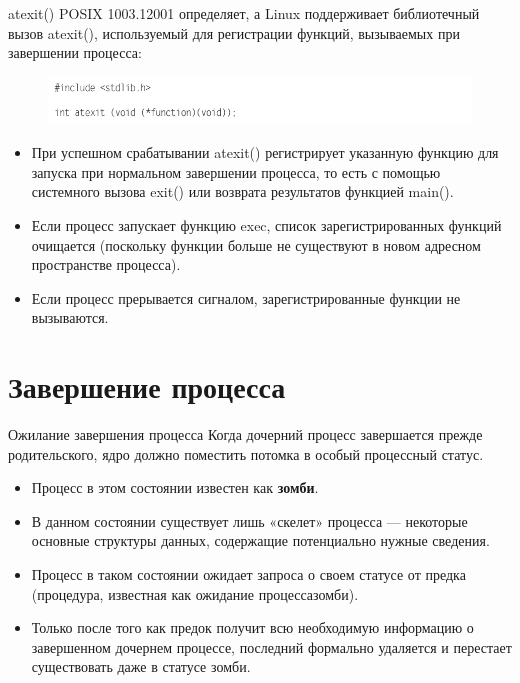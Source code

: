 \documentclass{beamer}
\begin{document}
\begin{frame}{atexit()}
POSIX 1003.1­2001 определяет, а Linux поддерживает библиотечный вызов atexit(),
используемый для регистрации функций, вызываемых при завершении процесса:
\begin{figure}[h]
\centering
\includegraphics[scale=0.5]{images/lec07-pic11.png}
\end{figure}
\begin{itemize}
\item При успешном срабатывании atexit() регистрирует указанную функцию для
запуска при нормальном завершении процесса, то есть с помощью системного
вызова exit() или возврата результатов функцией main(). 
\item Если процесс запускает функцию exec, список зарегистрированных функций очищается (поскольку функции больше не существуют в новом адресном пространстве процесса). 
\item Если процесс прерывается сигналом, зарегистрированные функции не вызываются.
\end{itemize}
\end{frame}

\section{Завершение процесса}

\begin{frame}{Ожилание завершения процесса}
Когда дочерний процесс завершается прежде родительского, ядро должно поместить потомка в особый процессный статус. 
\begin{itemize}
\item Процесс в этом состоянии известен как \textbf{зомби}. 
\item В данном состоянии существует лишь «скелет» процесса — некоторые основные структуры данных, содержащие потенциально нужные сведения. 
\item Процесс в таком состоянии ожидает запроса о своем статусе от предка (процедура, известная как ожидание процесса­зомби). 
\item Только после того как предок получит всю необходимую информацию о завершенном дочернем процессе, последний формально удаляется и перестает существовать даже в статусе зомби.
\end{itemize}
\end{frame}
\end{document}
